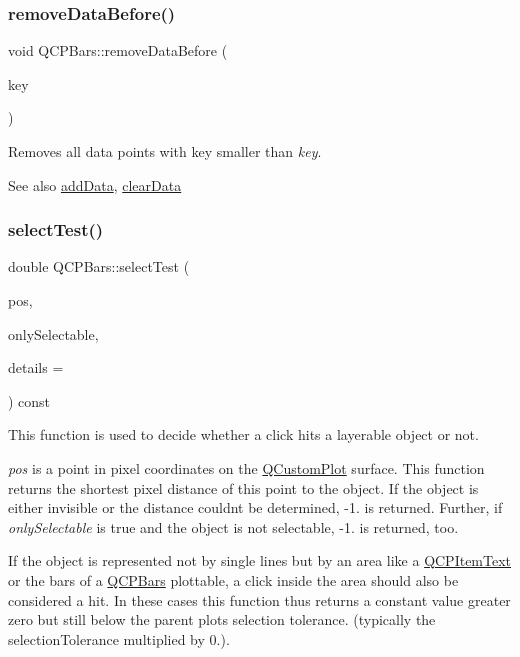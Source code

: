\subsubsection{\texorpdfstring{remove\+Data\+Before()}{removeDataBefore()}}
{\footnotesize\ttfamily void Q\+C\+P\+Bars\+::remove\+Data\+Before (\begin{DoxyParamCaption}\item[{double}]{key }\end{DoxyParamCaption})}

Removes all data points with key smaller than {\itshape key}. \begin{DoxySeeAlso}{See also}
\mbox{\hyperlink{class_q_c_p_bars_a1f29cf08615040993209147fa68de3f2}{add\+Data}}, \mbox{\hyperlink{class_q_c_p_bars_a11dbbd707132f07f862dff13c5789c2b}{clear\+Data}} 
\end{DoxySeeAlso}
\mbox{\label{class_q_c_p_bars_a62d66cc8eedca6bedfc1f6513164d418}} 
\subsubsection{\texorpdfstring{select\+Test()}{selectTest()}}
{\footnotesize\ttfamily double Q\+C\+P\+Bars\+::select\+Test (\begin{DoxyParamCaption}\item[{const Q\+PointF \&}]{pos,  }\item[{bool}]{only\+Selectable,  }\item[{Q\+Variant $\ast$}]{details = {} }\end{DoxyParamCaption}) const\hspace{0.3cm}{\ttfamily [virtual]}}

This function is used to decide whether a click hits a layerable object or not.

{\itshape pos} is a point in pixel coordinates on the \mbox{\hyperlink{class_q_custom_plot}{Q\+Custom\+Plot}} surface. This function returns the shortest pixel distance of this point to the object. If the object is either invisible or the distance couldn\textquotesingle{}t be determined, -\/1. is returned. Further, if {\itshape only\+Selectable} is true and the object is not selectable, -\/1. is returned, too.

If the object is represented not by single lines but by an area like a \mbox{\hyperlink{class_q_c_p_item_text}{Q\+C\+P\+Item\+Text}} or the bars of a \mbox{\hyperlink{class_q_c_p_bars}{Q\+C\+P\+Bars}} plottable, a click inside the area should also be considered a hit. In these cases this function thus returns a constant value greater zero but still below the parent plot\textquotesingle{}s selection tolerance. (typically the selection\+Tolerance multiplied by 0.).

